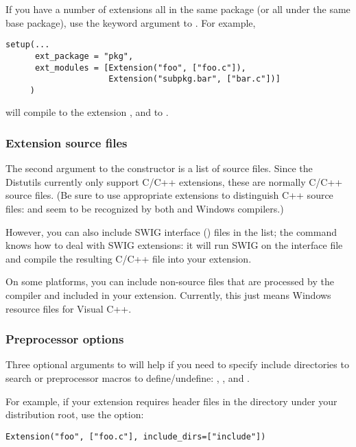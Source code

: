 \documentclass{howto}
\begin{document}
If you have a number of extensions all in the same package (or all under
the same base package), use the  keyword argument
to .  For example,
\begin{verbatim}
setup(...
      ext_package = "pkg",
      ext_modules = [Extension("foo", ["foo.c"]),
                     Extension("subpkg.bar", ["bar.c"])]
     )
\end{verbatim}
will compile  to the extension , and
 to .


\subsubsection{Extension source files}

The second argument to the  constructor is a list of
source files.  Since the Distutils currently only support C/C++
extensions, these are normally C/C++ source files.  (Be sure to use
appropriate extensions to distinguish C++ source files:  and
 seem to be recognized by both \UNIX{} and Windows compilers.)

However, you can also include SWIG interface () files in the
list; the  command knows how to deal with SWIG
extensions: it will run SWIG on the interface file and compile the
resulting C/C++ file into your extension.


On some platforms, you can include non-source files that are processed
by the compiler and included in your extension.  Currently, this just
means Windows resource files for Visual C++.  


\subsubsection{Preprocessor options}

Three optional arguments to  will help if you need to
specify include directories to search or preprocessor macros to
define/undefine: , , and
.

For example, if your extension requires header files in the
 directory under your distribution root, use the
 option:
\begin{verbatim}
Extension("foo", ["foo.c"], include_dirs=["include"])
\end{verbatim}
\end{document}
